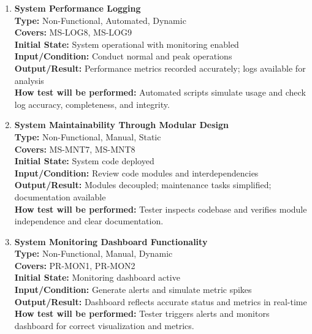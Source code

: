 \documentclass[12pt, titlepage]{article}
\begin{document}
\begin{enumerate}[label=NFR-ST \arabic*., wide=0pt, leftmargin=*]
  \item \textbf{System Performance Logging} \\[2mm]
    \textbf{Type:} Non-Functional, Automated, Dynamic \\
    \textbf{Covers:} MS-LOG8, MS-LOG9 \\
    \textbf{Initial State:} System operational with monitoring enabled \\
    \textbf{Input/Condition:} Conduct normal and peak operations \\
    \textbf{Output/Result:} Performance metrics recorded accurately;
    logs available for analysis \\[2mm]
    \textbf{How test will be performed:} Automated scripts simulate
    usage and check log accuracy, completeness, and integrity.

  \item \textbf{System Maintainability Through Modular Design} \\[2mm]
    \textbf{Type:} Non-Functional, Manual, Static \\
    \textbf{Covers:} MS-MNT7, MS-MNT8 \\
    \textbf{Initial State:} System code deployed \\
    \textbf{Input/Condition:} Review code modules and interdependencies \\
    \textbf{Output/Result:} Modules decoupled; maintenance tasks
    simplified; documentation available \\[2mm]
    \textbf{How test will be performed:} Tester inspects codebase and
    verifies module independence and clear documentation.

  \item \textbf{System Monitoring Dashboard Functionality} \\[2mm]
    \textbf{Type:} Non-Functional, Manual, Dynamic \\
    \textbf{Covers:} PR-MON1, PR-MON2 \\
    \textbf{Initial State:} Monitoring dashboard active \\
    \textbf{Input/Condition:} Generate alerts and simulate metric spikes \\
    \textbf{Output/Result:} Dashboard reflects accurate status and
    metrics in real-time \\[2mm]
    \textbf{How test will be performed:} Tester triggers alerts and
    monitors dashboard for correct visualization and metrics.


\end{enumerate}
\end{document}
